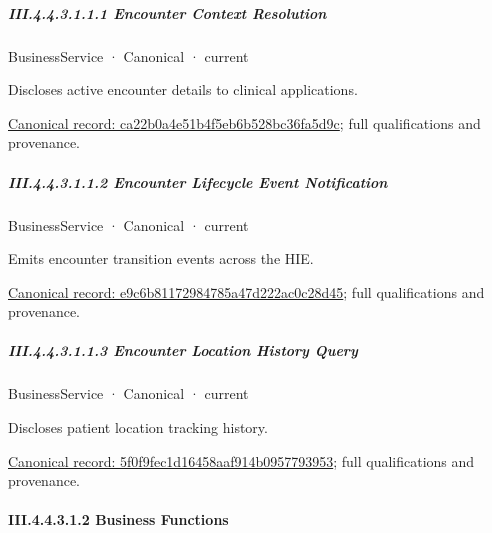\subparagraph*{III.4.4.3.1.1.1 Encounter Context Resolution}
\label{navigation:III.4.4.3.1.1.1}

\label{element:ca22b0a4e51b4f5eb6b528bc36fa5d9c}
{\small BusinessService · Canonical · current}\par

Discloses active encounter details to clinical applications.


{\footnotesize \href{../../../../continuum/business/business-service/ca22b0a4e51b4f5eb6b528bc36fa5d9c.md}{Canonical record: ca22b0a4e51b4f5eb6b528bc36fa5d9c}; full qualifications and provenance.}\par
\subparagraph*{III.4.4.3.1.1.2 Encounter Lifecycle Event Notification}
\label{navigation:III.4.4.3.1.1.2}

\label{element:e9c6b81172984785a47d222ac0c28d45}
{\small BusinessService · Canonical · current}\par

Emits encounter transition events across the HIE.


{\footnotesize \href{../../../../continuum/business/business-service/e9c6b81172984785a47d222ac0c28d45.md}{Canonical record: e9c6b81172984785a47d222ac0c28d45}; full qualifications and provenance.}\par
\subparagraph*{III.4.4.3.1.1.3 Encounter Location History Query}
\label{navigation:III.4.4.3.1.1.3}

\label{element:5f0f9fec1d16458aaf914b0957793953}
{\small BusinessService · Canonical · current}\par

Discloses patient location tracking history.


{\footnotesize \href{../../../../continuum/business/business-service/5f0f9fec1d16458aaf914b0957793953.md}{Canonical record: 5f0f9fec1d16458aaf914b0957793953}; full qualifications and provenance.}\par
\paragraph*{III.4.4.3.1.2 Business Functions}
\label{navigation:III.4.4.3.1.2}


